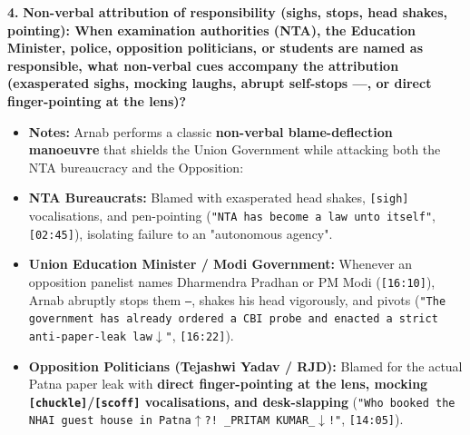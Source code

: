 \documentclass[10pt,a4paper]{article}
\begin{document}
\noindent\textbf{4.} \textbf{Non-verbal attribution of responsibility (sighs, stops, head shakes, pointing): When examination authorities (NTA), the Education Minister, police, opposition politicians, or students are named as responsible, what non-verbal cues accompany the attribution (exasperated sighs, mocking laughs, abrupt self-stops ---, or direct finger-pointing at the lens)?}\par\smallskip
\begin{itemize}
  \item \textbf{Notes:}
Arnab performs a classic \textbf{non-verbal blame-deflection manoeuvre} that shields the Union Government while attacking both the NTA bureaucracy and the Opposition:\par\smallskip
  \item \textbf{NTA Bureaucrats:} Blamed with exasperated head shakes, \texttt{[sigh]} vocalisations, and pen-pointing (\texttt{"NTA has become a law unto itself"}, \texttt{[02:45]}), isolating failure to an "autonomous agency".
  \item \textbf{Union Education Minister / Modi Government:} Whenever an opposition panelist names Dharmendra Pradhan or PM Modi (\texttt{[16:10]}), Arnab abruptly stops them \texttt{---}, shakes his head vigorously, and pivots (\texttt{"The government has already ordered a CBI probe and enacted a strict anti-paper-leak law$\downarrow$"}, \texttt{[16:22]}).
  \item \textbf{Opposition Politicians (Tejashwi Yadav / RJD):} Blamed for the actual Patna paper leak with \textbf{direct finger-pointing at the lens, mocking \texttt{[chuckle]}/\texttt{[scoff]} vocalisations, and desk-slapping} (\texttt{"Who booked the NHAI guest house in Patna$\uparrow$?! \_PRITAM KUMAR\_$\downarrow$!"}, \texttt{[14:05]}).
\end{itemize}
\end{document}

